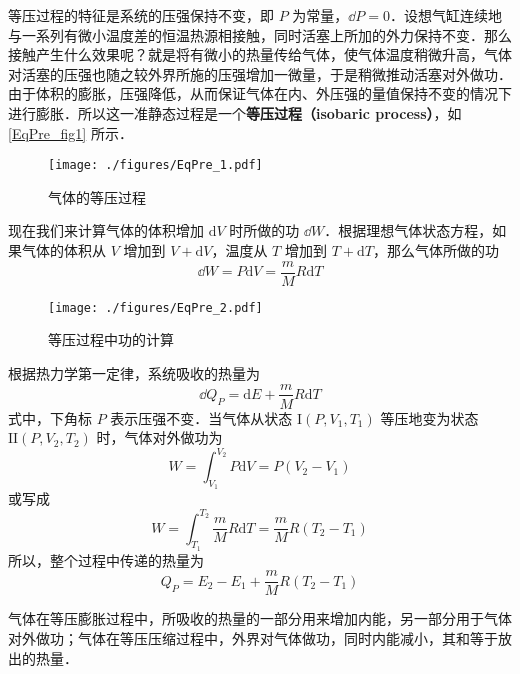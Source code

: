 

等压过程的特征是系统的压强保持不变，即 $P$ 为常量，$\dd P =0$．设想气缸连续地与一系列有微小温度差的恒温热源相接触，同时活塞上所加的外力保持不变．那么接触产生什么效果呢？就是将有微小的热量传给气体，使气体温度稍微升高，气体对活塞的压强也随之较外界所施的压强增加一微量，于是稍微推动活塞对外做功．由于体积的膨胀，压强降低，从而保证气体在内、外压强的量值保持不变的情况下进行膨胀．所以这一准静态过程是一个\textbf{等压过程（isobaric process）}，如\autoref{EqPre_fig1} 所示．
\begin{figure}[ht]
\centering
\texttt{[image: ./figures/EqPre\_1.pdf]}
\caption{气体的等压过程} \label{EqPre_fig1}
\end{figure}
现在我们来计算气体的体积增加 $\mathrm d V $ 时所做的功 $\dd W$．根据理想气体状态方程，如果气体的体积从 $V $ 增加到 $V+\mathrm dV$，温度从 $T $ 增加到 $T+\mathrm dT$，那么气体所做的功
\begin{equation}
\dd W=P \mathrm{d} V=\frac{m}{M} R \mathrm{d} T
\end{equation}
\begin{figure}[ht]
\centering
\texttt{[image: ./figures/EqPre\_2.pdf]}
\caption{等压过程中功的计算} \label{EqPre_fig2}
\end{figure}
根据热力学第一定律，系统吸收的热量为
\begin{equation}
\dd Q_{P}=\mathrm{d} E+\frac{m}{M} R \mathrm{d} T
\end{equation}
式中，下角标 $P$ 表示压强不变．当气体从状态 $\mathrm I(P, V_1, T_1)$ 等压地变为状态 $\mathrm{II}(P, V_2,T_2)$ 时，气体对外做功为
\begin{equation}
W=\int_{V_{1}}^{V_{2}} P \mathrm{d} V=P\left(V_{2}-V_{1}\right)
\end{equation}
或写成
\begin{equation}
W=\int_{T_{1}}^{T_{2}} \frac{m}{M} R \mathrm{d} T=\frac{m}{M} R\left(T_{2}-T_{1}\right)
\end{equation}
所以，整个过程中传递的热量为
\begin{equation}
Q_{P}=E_{2}-E_{1}+\frac{m}{M} R\left(T_{2}-T_{1}\right)
\end{equation}

气体在等压膨胀过程中，所吸收的热量的一部分用来增加内能，另一部分用于气体对外做功；气体在等压压缩过程中，外界对气体做功，同时内能减小，其和等于放出的热量．

